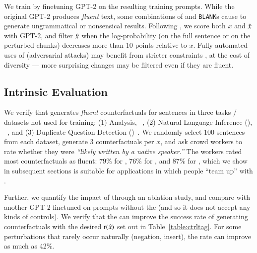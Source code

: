 We train \sysname by finetuning GPT-2 \cite{radford2019language} on the resulting training prompts.
While the original GPT-2 produces \emph{fluent} text,
some combinations of \tagstrs and \texttt{BLANK}s cause \sysname to generate ungrammatical or nonsensical results.
Following \citet{morris2020textattack}, we score both $x$ and $\hat{x}$ with GPT-2, and filter $\hat{x}$ when the log-probability (on the full sentence or on the perturbed chunks) decreases more than 10 points relative to $x$.
Fully automated uses of \sysname (\eg adversarial attacks) may benefit from stricter constraints \cite{morris2020textattack}, at the cost of diversity --- more surprising changes may be filtered even if they are fluent.


\subsection{Intrinsic Evaluation}
\label{subsec:intrinsic}



We verify that \sysname generates \emph{fluent} counterfactuals for sentences in three tasks / datasets not used for training: (1) \sst Analysis, \dsst~\cite{socher2013recursive},
(2) Natural Language Inference (\nli), \dnli~\cite{bowman-etal-2015-large}, and 
(3) Duplicate Question Detection (\dqqp)~\cite{wang2018glue}.
We randomly select 100 sentences from each dataset, generate 3 \sysname counterfactuals per $x$, and ask crowd workers to rate whether they were \emph{``likely written by a native speaker.''}
The workers rated most counterfactuals as fluent: $79\%$ for \dsst, $76\%$ for \dqqp, and $87\%$ for \dnli,  which we show in subsequent sections is suitable for applications in which people ``team up'' with \sysname.

Further, we quantify the impact of \tagstrs through an ablation study, and compare \sysname with another GPT-2 finetuned on prompts without the \tagstrshorts (and so it does not accept any kinds of controls). 
We verify that the \tagstrshorts can improve the success rate of generating counterfactuals with the desired $\operatorname*{r}(\hat{x})$ set out in Table~\ref{table:ctrltag}.
For some perturbations that rarely occur naturally (\eg negation, insert), the rate can improve as much as 42\%.

